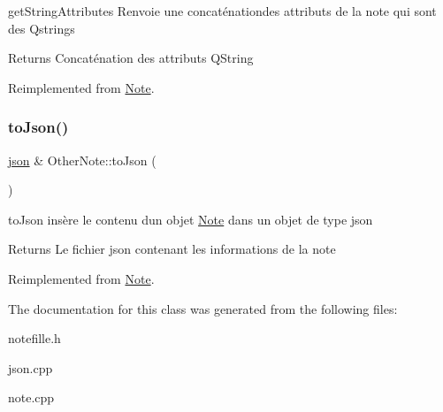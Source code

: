 get\+String\+Attributes Renvoie une concaténationdes attributs de la note qui sont des Qstrings 

\begin{DoxyReturn}{Returns}
Concaténation des attributs Q\+String 
\end{DoxyReturn}


Reimplemented from \hyperlink{classNote_a0ffff907bdb41b8c6a4abe62dfa3a2c1}{Note}.

\mbox{\label{classOtherNote_a0fb04e9da102ac17fb777f29bfc24a57}} 
\subsubsection{\texorpdfstring{to\+Json()}{toJson()}}
{\footnotesize\ttfamily \hyperlink{classnlohmann_1_1basic__json}{json} \& Other\+Note\+::to\+Json (\begin{DoxyParamCaption}{ }\end{DoxyParamCaption})\hspace{0.3cm}{\ttfamily [virtual]}}



to\+Json insère le contenu d\textquotesingle{}un objet \hyperlink{classNote}{Note} dans un objet de type json 

\begin{DoxyReturn}{Returns}
Le fichier json contenant les informations de la note 
\end{DoxyReturn}


Reimplemented from \hyperlink{classNote_ac5bd9736feb45b144795d7ef1fc6a1ae}{Note}.



The documentation for this class was generated from the following files\+:\begin{DoxyCompactItemize}
\item 
notefille.\+h\item 
json.\+cpp\item 
note.\+cpp\end{DoxyCompactItemize}
